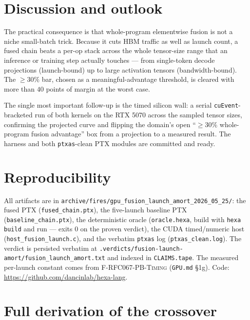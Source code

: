 \documentclass[11pt,a4paper]{article}
\begin{document}
\section{Discussion and outlook}
\label{sec:discussion}

The practical consequence is that whole-program elementwise fusion is not a
niche small-batch trick. Because it cuts HBM traffic as well as launch count, a
fused chain beats a per-op stack across the whole tensor-size range that an
inference or training step actually touches --- from single-token decode
projections (launch-bound) up to large activation tensors (bandwidth-bound).
The $\ge 30\%$ bar, chosen as a meaningful-advantage threshold, is cleared with
more than $40$ points of margin at the worst case.

The single most important follow-up is the timed silicon wall: a serial
\texttt{cuEvent}-bracketed run of both kernels on the RTX 5070 across the
sampled tensor sizes, confirming the projected curve and flipping the
domain's open ``$\ge 30\%$ whole-program fusion advantage'' box from a
projection to a measured result. The harness and both \texttt{ptxas}-clean PTX
modules are committed and ready.

\section*{Reproducibility}

All artifacts are in
\texttt{archive/fires/gpu\_fusion\_launch\_amort\_2026\_05\_25/}: the fused PTX
(\texttt{fused\_chain.ptx}), the five-launch baseline PTX
(\texttt{baseline\_chain.ptx}), the deterministic oracle
(\texttt{oracle.hexa}, build with \texttt{hexa build} and run --- exits $0$ on
the proven verdict), the CUDA timed/numeric host
(\texttt{host\_fusion\_launch.c}), and the verbatim \texttt{ptxas} log
(\texttt{ptxas\_clean.log}). The verdict is persisted verbatim at
\texttt{.verdicts/fusion-launch-amort/fusion\_launch\_amort.txt} and indexed in
\texttt{CLAIMS.tape}. The measured per-launch constant comes from
\textsc{F-RFC067-PB-Timing} (\texttt{GPU.md} \S1g). Code:
\url{https://github.com/dancinlab/hexa-lang}.

\appendix

\section{Full derivation of the crossover}
\label{app:derivation}
\end{document}
